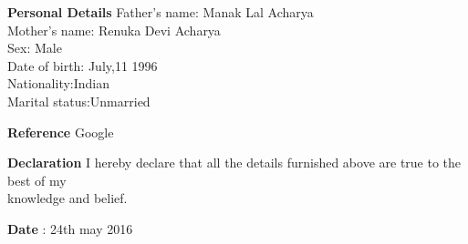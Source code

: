 \documentclass{article}
\begin{document}
	      
	      \begin{flushleft}
	      	\vspace{0.4in}
	      	\textbf{Personal Details} \hspace{0.36in}Father's name: \hspace{0.13in} Manak Lal Acharya \\
	      	\hspace{1.55in}Mother's name: \hspace{0.08in} Renuka Devi Acharya\\
	      	\hspace{1.55in}Sex:\hspace{0.85in} Male\\
	      	\hspace{1.55in}Date of birth:\hspace{0.255in} July,11 1996	\\
	      	\hspace{1.55in}Nationality:\hspace{0.45in}Indian\\
	      	\hspace{1.55in}Marital status:\hspace{0.28in}Unmarried
	      	
	      \end{flushleft}
	      
	      
	      \begin{flushleft}
	      	\vspace{0.4in}
	      	\textbf{Reference} \hspace{0.75in} Google
	      \end{flushleft}
	      
	      \begin{flushleft}
	      	\vspace{0.2in}
	      	\textbf{Declaration} \hspace{0.60in}  I hereby declare that all the details furnished above are true to the best of
	      	my\\\hspace{3.7cm} knowledge and belief.
	      \end{flushleft}
	      
	      \begin{flushleft}
	      	\vspace{0.2in}
	      	\textbf{Date} : 24th may 2016
	      \end{flushleft}
	    
\end{document}
